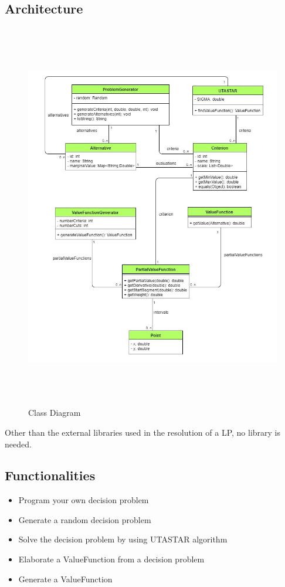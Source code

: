 \documentclass{report}
\begin{document}
\subsection{Architecture}
\begin{figure}[H]
    	\centering
	\includegraphics[width=17cm,height=17cm,keepaspectratio]{diagram-uml.png}
	\caption{Class Diagram}
\end{figure}
Other than the external libraries used in the resolution of a LP, no library is needed. \\

\subsection{Functionalities}
\begin{itemize}
\item Program your own decision problem
\item Generate a random decision problem
\item Solve the decision problem by using UTASTAR algorithm
\item Elaborate a ValueFunction from a decision problem
\item Generate a ValueFunction
\end{itemize}
\end{document}
